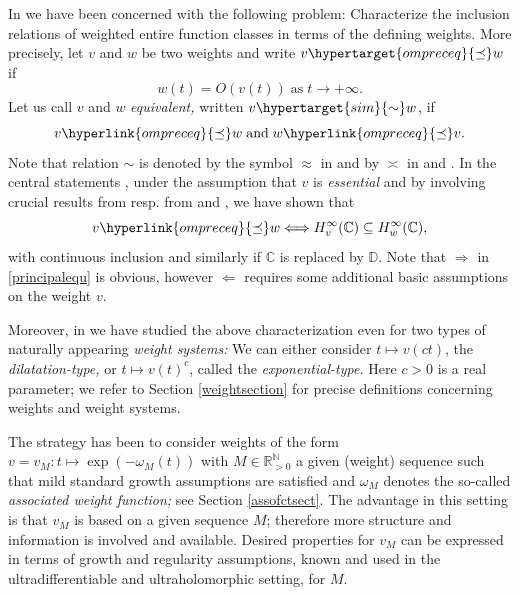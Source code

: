 \documentclass[10pt]{amsart}%
\numberwithin{equation}{section}
\theoremstyle{plain}
\newcommand{\RR}{\mathbb{R}}
\newcommand{\CC}{\mathbb{C}}
\newcommand{\NN}{\mathbb{N}}
\begin{document}
In \cite{weightedentirecharacterization} we have been concerned with the following problem: Characterize the inclusion relations of weighted entire function classes in terms of the defining weights. More precisely, let $v$ and $w$ be two weights and write $v\hypertarget{ompreceq}{\preceq}w$ if
\begin{equation}\label{bigOrelation}
w(t)=O(v(t))\;\text{as}\;t\rightarrow+\infty.	
\end{equation}
Let us call $v$ and $w$ {\itshape equivalent,} written $v\hypertarget{sim}{\sim}w$, if
$$v\hyperlink{ompreceq}{\preceq}w\;\text{and}\;w\hyperlink{ompreceq}{\preceq}v.$$
Note that relation \hyperlink{sim}{$\sim$} is denoted by the symbol $\approx$ in \cite{Bonet2022survey} and by $\asymp$ in \cite{AbakumovDoubtsov15} and \cite{AbakumovDoubtsov18}. In the central statements \cite[Thm. 3.2 \& Thm. 3.3]{weightedentirecharacterization}, under the assumption that $v$ is \emph{essential} and by involving crucial results from \cite{BonetDomanskiLindstroemTaskinen98} resp. from \cite{AbakumovDoubtsov15} and \cite{AbakumovDoubtsov18}, we have shown that
\begin{equation}\label{principalequ}
v\hyperlink{ompreceq}{\preceq}w\Longleftrightarrow H^{\infty}_{v}(\CC)\subseteq H^{\infty}_{w}(\CC),
\end{equation}
with continuous inclusion and similarly if $\CC$ is replaced by $\mathbb{D}$. Note that $\Longrightarrow$ in \eqref{principalequ} is obvious, however $\Longleftarrow$ requires some additional basic assumptions on the weight $v$.

Moreover, in \cite[Sect. 3.2-3.5]{weightedentirecharacterization} we have studied the above characterization even for two types of naturally appearing \emph{weight systems:} We can either consider $t\mapsto v(ct)$, the \emph{dilatation-type,} or $t\mapsto v(t)^c$, called the \emph{exponential-type.} Here $c>0$ is a real parameter; we refer to Section \ref{weightsection} for precise definitions concerning weights and weight systems.\vspace{6pt}

The strategy has been to consider weights of the form $v=v_M: t\mapsto\exp(-\omega_M(t))$ with $M\in\RR_{>0}^{\NN}$ a given (weight) sequence such that mild standard growth assumptions are satisfied and $\omega_M$ denotes the so-called {\itshape associated weight function;} see Section \ref{assofctsect}. The advantage in this setting is that $v_M$ is based on a given sequence $M$; therefore more structure and information is involved and available. Desired properties for $v_M$ can be expressed in terms of growth and regularity assumptions, known and used in the ultradifferentiable and ultraholomorphic setting, for $M$.
\end{document}
